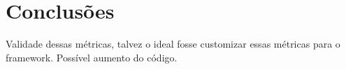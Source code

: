 \documentclass[
	12pt,				%
	openright,			%
	twoside,			%
	a4paper,			%
	english,			%
	french,				%
	spanish,			%
	brazil,				%
	]{abntex2}
\begin{document}
\section{Conclusões}

Validade dessas métricas, talvez o ideal fosse customizar essas métricas para o
framework.
Possível aumento do código.


% 

\postextual




%
%
\end{document}
